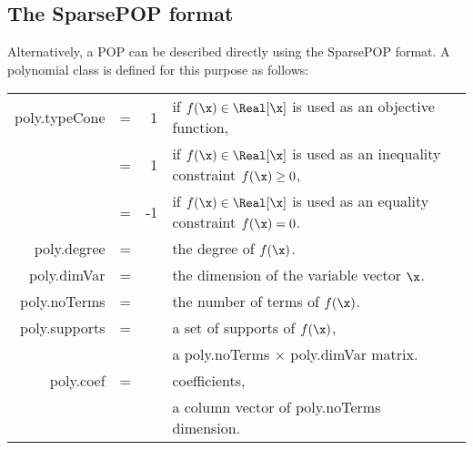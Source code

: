 \subsection{The SparsePOP format}

Alternatively, a POP 
can be described directly using the SparsePOP format. A polynomial class 
is defined for this purpose as follows: 
\begin{center}
\begin{tabular}{rcrll}
{\sf poly.typeCone} 	& = 	& 1 & if $f(\x) \in \Real[\x]$ is used as an objective function, \\
                            & =    & 1 & if $f(\x) \in \Real[\x]$ is used as an inequality constraint $f(\x) \geq 0$, \\ 
                            & =    & -1  & if $f(\x) \in \Real[\x]$ is used as an equality constraint $f(\x) = 0$. \\ 
{\sf poly.degree	}	& = 	& & the degree of $f(\x)$. \\
{\sf poly.dimVar	}	& =	& & the dimension of the variable vector $\x$. \\
{\sf poly.noTerms}  		& = 	& & the number of terms of $f(\x)$. \\
{\sf poly.supports}		& = 	& & a set of supports of $f(\x)$, \\
				&	& & a poly.noTerms $\times$ poly.dimVar matrix. \\
%
{\sf poly.coef}			& = 	& & coefficients, \\ 
				&	& & a column vector of poly.noTerms dimension. \\
\end{tabular}
\end{center}
